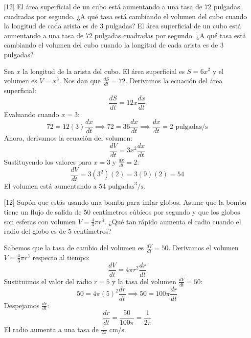 \documentclass[11pt,paper=a4,answers, addpoints]{exam}
\begin{document}
\begin{questions}
[12\half]
El área superficial de un cubo está aumentando a una tasa de 72 pulgadas cuadradas por segundo. ¿A qué tasa está cambiando el volumen del cubo cuando la longitud de cada arista es de 3 pulgadas?
El área superficial de un cubo está aumentando a una tasa de 72 pulgadas cuadradas por segundo. ¿A qué tasa está cambiando el volumen del cubo cuando la longitud de cada arista es de 3 pulgadas?
\begin{solution}
Sea $x$ la longitud de la arista del cubo. El área superficial es $S = 6x^2$ y el volumen es $V = x^3$.
Nos dan que $\frac{dS}{dt} = 72$. Derivamos la ecuación del área superficial:
\[ \frac{dS}{dt} = 12x \frac{dx}{dt} \]
Evaluando cuando $x = 3$:
\[ 72 = 12(3) \frac{dx}{dt} \implies 72 = 36 \frac{dx}{dt} \implies \frac{dx}{dt} = 2 \text{ pulgadas/s} \]
Ahora, derivamos la ecuación del volumen:
\[ \frac{dV}{dt} = 3x^2 \frac{dx}{dt} \]
Sustituyendo los valores para $x = 3$ y $\frac{dx}{dt} = 2$:
\[ \frac{dV}{dt} = 3(3^2)(2) = 3(9)(2) = 54 \]
El volumen está aumentando a $54 \text{ pulgadas}^3\text{/s}$.
\end{solution}

[12\half]
Supón que estás usando una bomba para inflar globos. Asume que la bomba tiene un flujo de salida de 50 centímetros cúbicos por segundo y que los globos son esferas con volumen $V=\frac{4}{3}\pi r^3$. ¿Qué tan rápido aumenta el radio cuando el radio del globo es de 5 centímetros?
\begin{solution}
Sabemos que la tasa de cambio del volumen es $\frac{dV}{dt} = 50$.
Derivamos el volumen $V=\frac{4}{3}\pi r^3$ respecto al tiempo:
\[ \frac{dV}{dt} = 4\pi r^2 \frac{dr}{dt} \]
Sustituimos el valor del radio $r = 5$ y la tasa del volumen $\frac{dV}{dt} = 50$:
\[ 50 = 4\pi (5)^2 \frac{dr}{dt} \implies 50 = 100\pi \frac{dr}{dt} \]
Despejamos $\frac{dr}{dt}$:
\[ \frac{dr}{dt} = \frac{50}{100\pi} = \frac{1}{2\pi} \]
El radio aumenta a una tasa de $\frac{1}{2\pi} \text{ cm/s}$.
\end{solution}


\end{questions}
\end{document}
